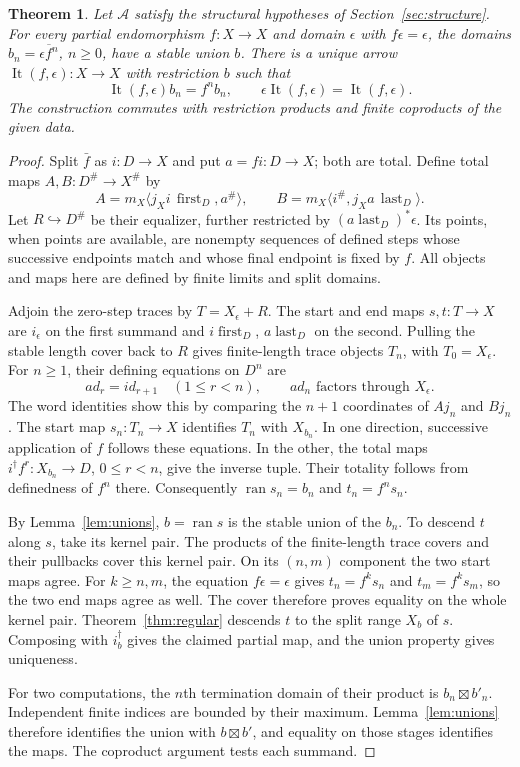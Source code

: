 \documentclass[11pt]{article}
\newtheorem{theorem}{Theorem}[section]
\theoremstyle{definition}\newtheorem{definition}[theorem]{Definition}
\theoremstyle{remark}\newtheorem{remark}[theorem]{Remark}
\newcommand{\A}{\mathscr A}
\newcommand{\ran}{\operatorname{ran}}
\newcommand{\It}{\operatorname{It}}
\begin{document}
\begin{theorem}\label{thm:iteration}
Let $\A$ satisfy the structural hypotheses of
Section~\ref{sec:structure}. For every partial endomorphism
$f:X\to X$ and domain $\epsilon$ with $f\epsilon=\epsilon$,
the domains $b_n=\overline{\epsilon f^n}$, $n\ge0$, have a
stable union $b$. There is a unique arrow $\It(f,\epsilon):X\to X$
with restriction $b$ such that
\[
 \It(f,\epsilon)b_n=f^n b_n,
 \qquad \epsilon\It(f,\epsilon)=\It(f,\epsilon).
\]
The construction commutes with restriction products and finite
coproducts of the given data.
\end{theorem}
\begin{proof}
Split $\bar f$ as $i:D\to X$ and put $a=fi:D\to X$; both
are total. Define total maps $A,B:D^\#\to X^\#$ by
\[
 A=m_X\langle j_Xi\,\operatorname{first}_D,a^\#\rangle,
 \qquad
 B=m_X\langle i^\#,j_Xa\,\operatorname{last}_D\rangle.
\]
Let $R\hookrightarrow D^\#$ be their equalizer, further
restricted by $(a\operatorname{last}_D)^*\epsilon$.
Its points, when points are available, are nonempty sequences of
defined steps whose successive endpoints match and whose final
endpoint is fixed by $f$. All objects and maps here are defined by
finite limits and split domains.

Adjoin the zero-step traces by $T=X_\epsilon+R$. The start and
end maps $s,t:T\to X$ are $i_\epsilon$ on the first summand
and $i\operatorname{first}_D$, $a\operatorname{last}_D$ on
the second. Pulling the stable length cover back to $R$ gives
finite-length trace objects $T_n$, with $T_0=X_\epsilon$.
For $n\ge1$, their defining equations on $D^n$ are
\[
 ad_r=id_{r+1}\quad(1\le r<n),
 \qquad ad_n\text{ factors through }X_\epsilon.
\]
The word identities show this by comparing the $n+1$ coordinates
of $Aj_n$ and $Bj_n$. The start map $s_n:T_n\to X$ identifies
$T_n$ with $X_{b_n}$. In one direction, successive application of
$f$ follows these equations. In the other, the total maps
$i^\dagger f^r:X_{b_n}\to D$, $0\le r<n$, give the inverse
tuple. Their totality follows from definedness of $f^n$ there.
Consequently $\ran s_n=b_n$ and $t_n=f^n s_n$.

By Lemma~\ref{lem:unions}, $b=\ran s$ is the stable union of
the $b_n$. To descend $t$ along $s$, take its kernel pair. The
products of the finite-length trace covers and their pullbacks
cover this kernel pair. On its $(n,m)$ component the two start
maps agree. For $k\ge n,m$, the equation $f\epsilon=\epsilon$
gives $t_n=f^k s_n$ and $t_m=f^k s_m$, so the two end maps
agree as well. The cover therefore proves equality on the whole
kernel pair. Theorem~\ref{thm:regular} descends $t$ to the split
range $X_b$ of $s$. Composing with $i_b^\dagger$ gives the
claimed partial map, and the union property gives uniqueness.

For two computations, the $n$th termination domain of their product
is $b_n\boxtimes b'_n$. Independent finite indices are bounded
by their maximum. Lemma~\ref{lem:unions} therefore identifies
the union with $b\boxtimes b'$, and equality on those stages
identifies the maps. The coproduct argument tests each summand.
\end{proof}
\end{document}
